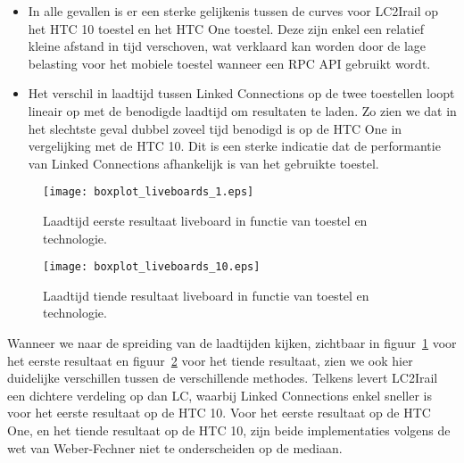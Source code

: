 \begin{itemize}
	\item In alle gevallen is er een sterke gelijkenis tussen de curves voor LC2Irail op het HTC 10 toestel en het HTC One toestel. Deze zijn enkel een relatief kleine afstand in tijd verschoven, wat verklaard kan worden door de lage belasting voor het mobiele toestel wanneer een RPC API gebruikt wordt.

	\item Het verschil in laadtijd tussen Linked Connections op de twee toestellen loopt lineair op met de benodigde laadtijd om resultaten te laden. Zo zien we dat in het slechtste geval dubbel zoveel tijd benodigd is op de HTC One in vergelijking met de HTC 10. Dit is een sterke indicatie dat de performantie van Linked Connections afhankelijk is van het gebruikte toestel.
\end{itemize}

\begin{figure}[h]
	\centering
	\texttt{[image: boxplot\_liveboards\_1.eps]}
	\caption[Laadtijd eerste resultaat liveboard in functie van toestel en technologie]{Laadtijd eerste resultaat liveboard in functie van toestel en technologie.}
	\label{fig:liveboardsBoxplot1}
\end{figure}

\begin{figure}[h]
	\centering
	\texttt{[image: boxplot\_liveboards\_10.eps]}
	\caption[Laadtijd tiende resultaat liveboard in functie van toestel en technologie]{Laadtijd tiende resultaat liveboard in functie van toestel en technologie.}
	\label{fig:liveboardsBoxplot10}
\end{figure}

Wanneer we naar de spreiding van de laadtijden kijken, zichtbaar in figuur~\ref{fig:liveboardsBoxplot1} voor het eerste resultaat en figuur~\ref{fig:liveboardsBoxplot10} voor het tiende resultaat, zien we ook hier duidelijke verschillen tussen de verschillende methodes. Telkens levert LC2Irail een dichtere verdeling op dan LC, waarbij Linked Connections enkel sneller is voor het eerste resultaat op de HTC 10. Voor het eerste resultaat op de HTC One, en het tiende resultaat op de HTC 10, zijn beide implementaties volgens de wet van Weber-Fechner niet te onderscheiden op de mediaan.

